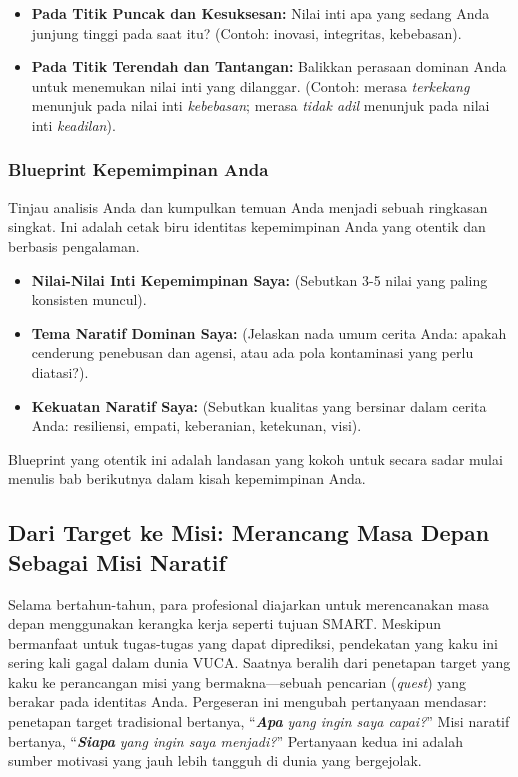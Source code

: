 \documentclass[
  letterpaper,
  DIV=11,
  numbers=noendperiod]{scrreprt}
\begin{document}
\begin{enumerate}
  \begin{itemize}
  \item
    \textbf{Pada Titik Puncak dan Kesuksesan:} Nilai inti apa yang
    sedang Anda junjung tinggi pada saat itu? (Contoh: inovasi,
    integritas, kebebasan).
  \item
    \textbf{Pada Titik Terendah dan Tantangan:} Balikkan perasaan
    dominan Anda untuk menemukan nilai inti yang dilanggar. (Contoh:
    merasa \emph{terkekang} menunjuk pada nilai inti \emph{kebebasan};
    merasa \emph{tidak adil} menunjuk pada nilai inti \emph{keadilan}).
  \end{itemize}
\end{enumerate}

\subsubsection{\texorpdfstring{\textbf{Blueprint Kepemimpinan
Anda}}{Blueprint Kepemimpinan Anda}}\label{blueprint-kepemimpinan-anda}

Tinjau analisis Anda dan kumpulkan temuan Anda menjadi sebuah ringkasan
singkat. Ini adalah cetak biru identitas kepemimpinan Anda yang otentik
dan berbasis pengalaman.

\begin{itemize}
\item
  \textbf{Nilai-Nilai Inti Kepemimpinan Saya:} (Sebutkan 3-5 nilai yang
  paling konsisten muncul).
\item
  \textbf{Tema Naratif Dominan Saya:} (Jelaskan nada umum cerita Anda:
  apakah cenderung penebusan dan agensi, atau ada pola kontaminasi yang
  perlu diatasi?).
\item
  \textbf{Kekuatan Naratif Saya:} (Sebutkan kualitas yang bersinar dalam
  cerita Anda: resiliensi, empati, keberanian, ketekunan, visi).
\end{itemize}

Blueprint yang otentik ini adalah landasan yang kokoh untuk secara sadar
mulai menulis bab berikutnya dalam kisah kepemimpinan Anda.

\subsection{Dari Target ke Misi: Merancang Masa Depan Sebagai Misi
Naratif}\label{dari-target-ke-misi-merancang-masa-depan-sebagai-misi-naratif}

Selama bertahun-tahun, para profesional diajarkan untuk merencanakan
masa depan menggunakan kerangka kerja seperti tujuan SMART. Meskipun
bermanfaat untuk tugas-tugas yang dapat diprediksi, pendekatan yang kaku
ini sering kali gagal dalam dunia VUCA. Saatnya beralih dari penetapan
target yang kaku ke perancangan misi yang bermakna---sebuah pencarian
(\emph{quest}) yang berakar pada identitas Anda. Pergeseran ini mengubah
pertanyaan mendasar: penetapan target tradisional bertanya,
``\textbf{\emph{Apa}} \emph{yang ingin saya capai?}'' Misi naratif
bertanya, ``\textbf{\emph{Siapa}} \emph{yang ingin saya menjadi?}''
Pertanyaan kedua ini adalah sumber motivasi yang jauh lebih tangguh di
dunia yang bergejolak.
\end{document}
